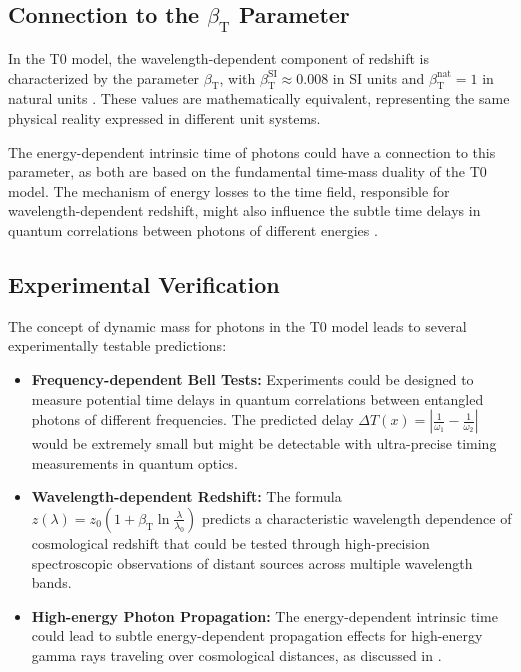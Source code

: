 \documentclass[12pt,a4paper]{article}
\newcommand{\Tfield}{T(x)}
\newcommand{\betaT}{\beta_{\text{T}}}
\begin{document}
	\subsection{Connection to the \(\betaT\) Parameter}
	\label{subsec:beta_t_connection}
	
	In the T0 model, the wavelength-dependent component of redshift is characterized by the parameter \(\betaT\), with \(\betaT^{\text{SI}} \approx 0.008\) in SI units and \(\betaT^{\text{nat}} = 1\) in natural units \cite{pascher_params_2025}. These values are mathematically equivalent, representing the same physical reality expressed in different unit systems.
	
	The energy-dependent intrinsic time of photons could have a connection to this parameter, as both are based on the fundamental time-mass duality of the T0 model. The mechanism of energy losses to the time field, responsible for wavelength-dependent redshift, might also influence the subtle time delays in quantum correlations between photons of different energies \cite{pascher_photons_2025}.
	
	\subsection{Experimental Verification}
	\label{subsec:experimental_verification}
	
	The concept of dynamic mass for photons in the T0 model leads to several experimentally testable predictions:
	
	\begin{itemize}
		\item \textbf{Frequency-dependent Bell Tests:} Experiments could be designed to measure potential time delays in quantum correlations between entangled photons of different frequencies. The predicted delay \(\Delta \Tfield = \left|\frac{1}{\omega_1} - \frac{1}{\omega_2}\right|\) would be extremely small but might be detectable with ultra-precise timing measurements in quantum optics.
		
		\item \textbf{Wavelength-dependent Redshift:} The formula \(z(\lambda) = z_0 \left(1 + \betaT \ln\frac{\lambda}{\lambda_0}\right)\) predicts a characteristic wavelength dependence of cosmological redshift that could be tested through high-precision spectroscopic observations of distant sources across multiple wavelength bands.
		
		\item \textbf{High-energy Photon Propagation:} The energy-dependent intrinsic time could lead to subtle energy-dependent propagation effects for high-energy gamma rays traveling over cosmological distances, as discussed in \cite{pascher_photons_2025}.
	\end{itemize}
	
\end{document}
